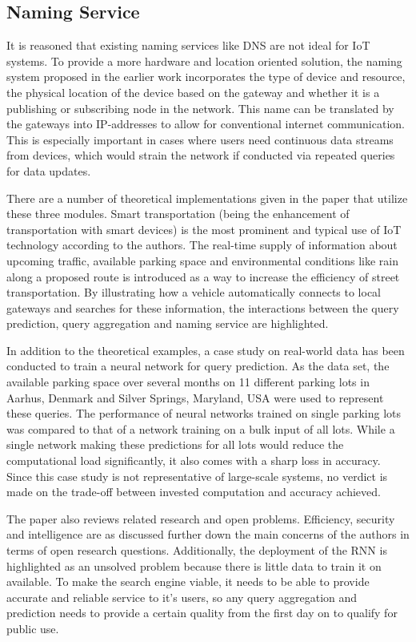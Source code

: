 \documentclass [journal]{IEEEtran}
\begin{document}
 \subsection{Naming Service}
It is reasoned that existing naming services like DNS are not ideal for IoT systems. To provide a more hardware and location oriented solution, the naming system proposed in the earlier work \cite{mainPrevious} incorporates the type of device and resource, the physical location of the device based on the gateway and whether it is a publishing or subscribing node in the network. This name can be translated by the gateways into IP-addresses to allow for conventional internet communication. This is especially important in cases where users need continuous data streams from devices, which would strain the network if conducted via repeated queries for data updates. \par
 \vspace{5mm}
There are a number of theoretical implementations given in the paper that utilize these three modules. Smart transportation (being the enhancement of transportation with smart devices) is the most prominent and typical use of IoT technology according to the authors. The real-time supply of information about upcoming traffic, available parking space and environmental conditions like rain along a proposed route is introduced as a way to increase the efficiency of street transportation. By illustrating how a vehicle automatically connects to local gateways and searches for these information, the interactions between the query prediction, query aggregation and naming service are highlighted. \par
In addition to the theoretical examples, a case study on real-world data has been conducted to train a neural network for query prediction. As the data set, the available parking space over several months on 11 different parking lots in Aarhus, Denmark and Silver Springs, Maryland, USA were used to represent these queries. The performance of neural networks trained on single parking lots was compared to that of a network training on a bulk input of all lots. While a single network making these predictions for all lots would reduce the computational load significantly, it also comes with a sharp loss in accuracy. Since this case study is not representative of large-scale systems, no verdict is made on the trade-off between invested computation and accuracy achieved. \par
The paper also reviews related research and open problems. Efficiency, security and intelligence are as discussed further down the main concerns of the authors in terms of open research questions. Additionally, the deployment of the RNN is highlighted as an unsolved problem because there is little data to train it on available. To make the search engine viable, it needs to be able to provide accurate and reliable service to it's users, so any query aggregation and prediction needs to provide a certain quality from the first day on to qualify for public use.
\end{document}

